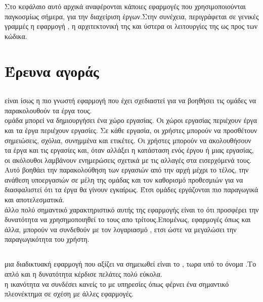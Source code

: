 Στο κεφάλαιο αυτό αρχικά αναφέρονται κάποιες εφαρμογές που χρησιμοποιούνται παγκοσμίως σήμερα, για την διαχείριση έργων.Στην συνέχεια, περιγράφεται σε γενικές γραμμές η εφαρμογή , η αρχιτεκτονική της και ύστερα οι λειτουργίες της ως προς των κώδικα.

\section{Έρευνα αγοράς}


\subsection{}
  είναι ίσως η πιο γνωστή εφαρμογή που έχει σχεδιαστεί για να βοηθήσει τις ομάδες να παρακολουθούν τα έργα τους.\\
 ομάδα μπορεί να δημιουργήσει ένα χώρο εργασίας. Οι χώροι εργασίας περιέχουν έργα και τα έργα περιέχουν εργασίες. Σε κάθε εργασία, οι χρήστες μπορούν να προσθέτουν σημειώσεις, σχόλια, συνημμένα και ετικέτες. Οι χρήστες μπορούν να ακολουθήσουν τα έργα και τις εργασίες και, όταν αλλάξει η κατάσταση ενός έργου ή μιας εργασίας, οι ακόλουθοι λαμβάνουν ενημερώσεις σχετικά με τις αλλαγές στα εισερχόμενά τους.  Αυτό βοηθάει την παρακολούθηση των εργασιών από την αρχή μέχρι το τέλος, την ανάθεση υποεργασιών σε μέλη της ομάδας και τον καθορισμό προθεσμιών για να διασφαλιστεί ότι τα έργα θα γίνουν εγκαίρως. Έτσι ομάδες εργάζονται πιο παραγωγικά και αποτελεσματικά.\\
 άλλο πολύ σημαντικό χαρακτηριστικό αυτής της εφαρμογής είναι το ότι προσφέρει την δυνατότητα να χρησημοποιηθεί το  τους απο τρίτους.Επομένως, εφαρμογές όπως  και άλλα, μπορούν να συνδεθούν με τον λογαριασμό , ετσι ώστε να μεγαλώσει την παραγωγικότητα του χρήστη.

\subsection{}
 μια διαδικτυακή εφαρμογή που αξίζει να σημειωθεί είναι το , τωρα υπό το όνομα .Το απλό  και η δυνατότητα  κέρδισε πελάτες πολύ εύκολα.\\
 η ικανότητα να συνδέσει κανείς το  με υπηρεσίες όπως  φέρνει ένα σημαντικό πλεονέκτημα σε σχέση με άλλες εφαρμογές. 

